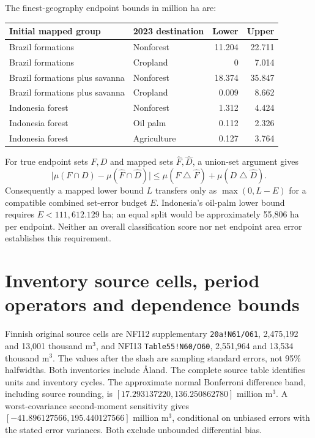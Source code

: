 The finest-geography endpoint bounds in million ha are:
\begin{center}\small
\begin{tabular}{llrr}\toprule
Initial mapped group & 2023 destination & Lower & Upper\\\midrule
Brazil formations & Nonforest & 11.204 & 22.711\\
Brazil formations & Cropland & 0 & 7.014\\
Brazil formations plus savanna & Nonforest & 18.374 & 35.847\\
Brazil formations plus savanna & Cropland & 0.009 & 8.662\\
Indonesia forest & Nonforest & 1.312 & 4.424\\
Indonesia forest & Oil palm & 0.112 & 2.326\\
Indonesia forest & Agriculture & 0.127 & 3.764\\\bottomrule
\end{tabular}\end{center}

For true endpoint sets $F,D$ and mapped sets $\widehat F,\widehat D$, a union-set argument gives
\[
\bigl|\mu(F\cap D)-\mu(\widehat F\cap\widehat D)\bigr|
\le\mu(F\mathbin{\triangle}\widehat F)+\mu(D\mathbin{\triangle}\widehat D).
\]
Consequently a mapped lower bound $L$ transfers only as $\max(0,L-E)$ for a compatible combined set-error budget $E$. Indonesia's oil-palm lower bound requires $E<111,612.129$ ha; an equal split would be approximately 55,806 ha per endpoint. Neither an overall classification score nor net endpoint area error establishes this requirement.

\section{Inventory source cells, period operators and dependence bounds}
Finnish original source cells are NFI12 supplementary \texttt{20a!N61/O61}, 2,475,192 and 13,001 thousand m$^3$, and NFI13 \texttt{Table55!N60/O60}, 2,551,964 and 13,534 thousand m$^3$. The values after the slash are sampling standard errors, not 95\% halfwidths. Both inventories include \AA land. The complete source table identifies units and inventory cycles. The approximate normal Bonferroni difference band, including source rounding, is $[17.293137220,136.250862780]$ million m$^3$. A worst-covariance second-moment sensitivity gives $[-41.896127566,195.440127566]$ million m$^3$, conditional on unbiased errors with the stated error variances. Both exclude unbounded differential bias.

